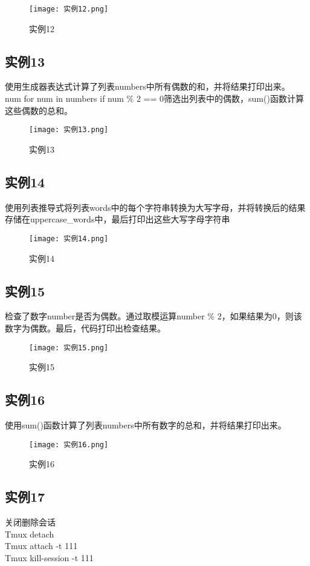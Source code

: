 \documentclass[a4paper, 12pt]{article}
\begin{document}
\begin{figure}[h!]
  \centering
  \texttt{[image: 实例12.png]}
  \caption{实例12}
\end{figure}

\subsection{实例13}
使用生成器表达式计算了列表numbers中所有偶数的和，并将结果打印出来。\\
num for num in numbers if num \% 2 == 0筛选出列表中的偶数，sum()函数计算这些偶数的总和。

\begin{figure}[h!]
  \centering
  \texttt{[image: 实例13.png]}
  \caption{实例13}
\end{figure}

\subsection{实例14}
使用列表推导式将列表words中的每个字符串转换为大写字母，并将转换后的结果存储在uppercase\_words中，最后打印出这些大写字母字符串

\begin{figure}[h!]
  \centering
  \texttt{[image: 实例14.png]}
  \caption{实例14}
\end{figure}

\subsection{实例15}
检查了数字number是否为偶数。通过取模运算number \% 2，如果结果为0，则该数字为偶数。最后，代码打印出检查结果。

\begin{figure}[h!]
  \centering
  \texttt{[image: 实例15.png]}
  \caption{实例15}
\end{figure}

\subsection{实例16}
使用sum()函数计算了列表numbers中所有数字的总和，并将结果打印出来。

\begin{figure}[h!]
  \centering
  \texttt{[image: 实例16.png]}
  \caption{实例16}
\end{figure}

\subsection{实例17}
关闭删除会话\\
Tmux detach\\
Tmux attach -t 111\\
Tmux kill-session -t 111\\
\end{document}
